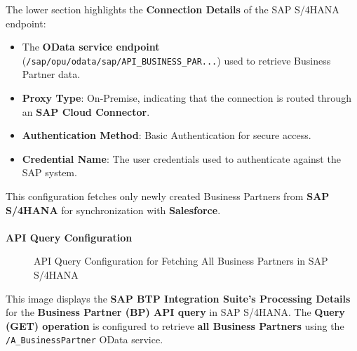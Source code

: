 The lower section highlights the \textbf{Connection Details} of the SAP S/4HANA endpoint:
\begin{itemize}
    \item The \textbf{OData service endpoint} (\texttt{/sap/opu/odata/sap/API\_BUSINESS\_PAR...}) used to retrieve Business Partner data.
    \item \textbf{Proxy Type}: On-Premise, indicating that the connection is routed through an \textbf{SAP Cloud Connector}.
    \item \textbf{Authentication Method}: Basic Authentication for secure access.
    \item \textbf{Credential Name}: The user credentials used to authenticate against the SAP system.
\end{itemize}

This configuration fetches only newly created Business Partners from \textbf{SAP S/4HANA} for synchronization with \textbf{Salesforce}.

\paragraph{}
\textbf{API Query Configuration}

\begin{figure}[h]
    \centering
    \caption{API Query Configuration for Fetching All Business Partners in SAP S/4HANA}
    \label{fig:bp_api_query}
\end{figure}

\noindent This image displays the \textbf{SAP BTP Integration Suite's Processing Details} for the \textbf{Business Partner (BP) API query} in SAP S/4HANA. The \textbf{Query (GET) operation} is configured to retrieve \textbf{all Business Partners} using the \texttt{/A\_BusinessPartner} OData service.

